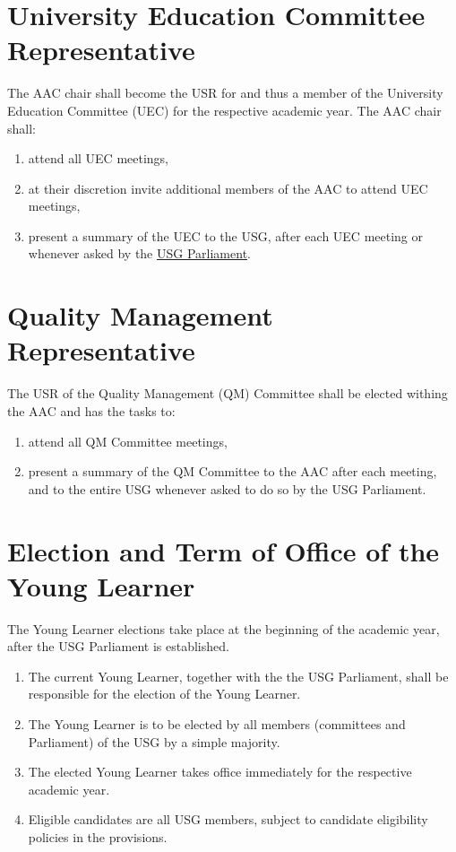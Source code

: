 \documentclass[12pt]{LaTeX_Misc/constitution}
\begin{document}
\section{University Education Committee Representative}
The AAC chair shall become the USR for and thus a member of the University Education Committee (UEC) for the respective academic year. The AAC chair shall:
\begin{enumerate}
\item
attend all UEC meetings,

\item
at their discretion invite additional members of the AAC to attend UEC meetings,

\item
present a summary of the UEC to the USG, after each UEC meeting or whenever asked by the \hyperref[USGParliamentDef]{USG Parliament}.
\end{enumerate}

\section{Quality Management Representative}
The USR of the Quality Management (QM) Committee shall be elected withing the AAC and has the tasks to: 
\begin{enumerate}
\item
attend all QM Committee meetings, 

\item
present a summary of the QM Committee to the AAC after each meeting, and to the entire USG whenever asked to do so by the USG Parliament.
\end{enumerate}


\section{Election and Term of Office of the Young Learner}

The Young Learner elections take place at the beginning of the academic year, after the USG Parliament is established.
\begin{enumerate}[label={\textbf{\S\arabic*}}]
\item 
The current Young Learner, together with the the USG Parliament, shall be responsible for  the election of the Young Learner. 

\item 
The Young Learner is to be elected by all members (committees and Parliament) of the USG by a simple majority.

\item
The elected Young Learner takes office immediately for the respective academic year.

\item
Eligible candidates are all USG members, subject to candidate eligibility policies in the provisions.

\end{enumerate}
\end{document}
